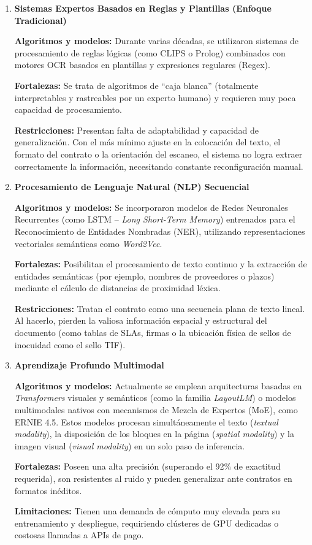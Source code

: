 \documentclass[12pt]{article}
\begin{document}
\begin{enumerate}
    \item[\textbf{A.}] \textbf{Sistemas Expertos Basados en Reglas y Plantillas (Enfoque Tradicional)}

    \textbf{Algoritmos y modelos:} Durante varias décadas, se utilizaron sistemas de procesamiento de reglas lógicas (como CLIPS o Prolog) combinados con motores OCR basados en plantillas y expresiones regulares (Regex).

    \textbf{Fortalezas:} Se trata de algoritmos de ``caja blanca'' (totalmente interpretables y rastreables por un experto humano) y requieren muy poca capacidad de procesamiento.

    \textbf{Restricciones:} Presentan falta de adaptabilidad y capacidad de generalización. Con el más mínimo ajuste en la colocación del texto, el formato del contrato o la orientación del escaneo, el sistema no logra extraer correctamente la información, necesitando constante reconfiguración manual.

    \item[\textbf{B.}] \textbf{Procesamiento de Lenguaje Natural (NLP) Secuencial}

    \textbf{Algoritmos y modelos:} Se incorporaron modelos de Redes Neuronales Recurrentes (como LSTM -- \textit{Long Short-Term Memory}) entrenados para el Reconocimiento de Entidades Nombradas (NER), utilizando representaciones vectoriales semánticas como \textit{Word2Vec}.

    \textbf{Fortalezas:} Posibilitan el procesamiento de texto continuo y la extracción de entidades semánticas (por ejemplo, nombres de proveedores o plazos) mediante el cálculo de distancias de proximidad léxica.

    \textbf{Restricciones:} Tratan el contrato como una secuencia plana de texto lineal. Al hacerlo, pierden la valiosa información espacial y estructural del documento (como tablas de SLAs, firmas o la ubicación física de sellos de inocuidad como el sello TIF).

    \item[\textbf{C.}] \textbf{Aprendizaje Profundo Multimodal}

    \textbf{Algoritmos y modelos:} Actualmente se emplean arquitecturas basadas en \textit{Transformers} visuales y semánticos (como la familia \textit{LayoutLM}) o modelos multimodales nativos con mecanismos de Mezcla de Expertos (MoE), como ERNIE 4.5. Estos modelos procesan simultáneamente el texto (\textit{textual modality}), la disposición de los bloques en la página (\textit{spatial modality}) y la imagen visual (\textit{visual modality}) en un solo paso de inferencia.

    \textbf{Fortalezas:} Poseen una alta precisión (superando el 92\% de exactitud requerida), son resistentes al ruido y pueden generalizar ante contratos en formatos inéditos.

    \textbf{Limitaciones:} Tienen una demanda de cómputo muy elevada para su entrenamiento y despliegue, requiriendo clústeres de GPU dedicadas o costosas llamadas a APIs de pago.
\end{enumerate}
\end{document}
